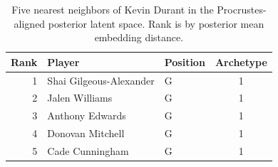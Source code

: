 \begin{table}[htbp]
  \centering\small
  \begin{tabular}{rllc}
    \toprule
    Rank & Player & Position & Archetype \\
    \midrule
    1 & Shai Gilgeous-Alexander & G & 1 \\
    2 & Jalen Williams & G & 1 \\
    3 & Anthony Edwards & G & 1 \\
    4 & Donovan Mitchell & G & 1 \\
    5 & Cade Cunningham & G & 1 \\
    \bottomrule
  \end{tabular}
  \caption{Five nearest neighbors of Kevin Durant in the Procrustes-aligned posterior latent space. Rank is by posterior mean embedding distance.}
  \label{tab:Kevin_Durant_neighbors}
\end{table}

